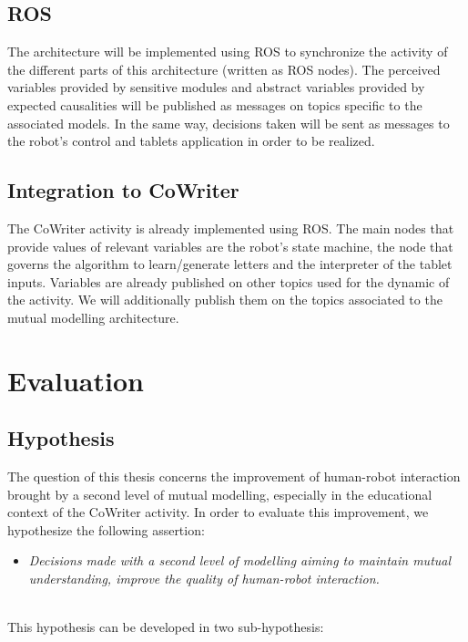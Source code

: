 \documentclass[10pt,a4paper]{article}
\begin{document}
\subsection{ROS} 

The architecture will be implemented using ROS to synchronize the activity of the different parts of this architecture (written as ROS nodes). The perceived variables provided by sensitive modules and abstract variables provided by expected causalities will be published as messages on topics specific to the associated models. In the same way, decisions taken will be sent as messages to the robot's control and tablets application in order to be realized. 

\subsection{Integration to CoWriter}

The CoWriter activity is already implemented using ROS. The main nodes that provide values of relevant variables are the robot's state machine, the node that governs the algorithm to learn/generate letters and the interpreter of the tablet inputs. Variables are already published on other topics used for the dynamic of the activity. We will additionally publish them on the topics associated to the mutual modelling architecture. 

\section{Evaluation}\label{eval}

\subsection{Hypothesis}

The question of this thesis concerns the improvement of human-robot interaction brought by a second level of mutual modelling, especially in the educational context of the CoWriter activity. In order to evaluate this improvement, we hypothesize the following assertion:\\
\begin{itemize}
\item \textit{Decisions made with a second level of modelling aiming to maintain mutual understanding, improve the quality of human-robot interaction.}
\end{itemize}
\hspace{1mm}\\
This hypothesis can be developed in two sub-hypothesis:\\
\end{document}
